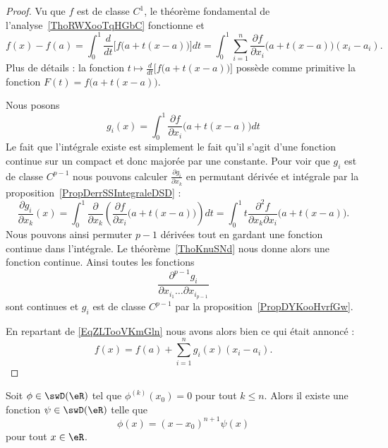 \begin{proof}
    Vu que \( f\) est de classe \( C^1\), le théorème fondamental de l'analyse~\ref{ThoRWXooTqHGbC} fonctionne et
    \begin{equation}    \label{EqZLTooVKmGln}
        f(x)-f(a)=\int_0^1\frac{ d }{ dt }\Big[ f\big( a+t(x-a) \big) \Big]dt=\int_0^1\sum_{i=1}^n\frac{ \partial f }{ \partial x_i }\big( a+t(x-a) \big)(x_i-a_i).
    \end{equation}
    Plus de détails : la fonction \( t\mapsto \frac{ d }{ dt }\Big[ f\big( a+t(x-a) \big) \Big]\) possède comme primitive la fonction \( F(t)=f\big( a+t(x-a) \big)\).

    Nous posons
    \begin{equation}
        g_i(x)=\int_0^1\frac{ \partial f }{ \partial x_i }\big( a+t(x-a) \big)dt
    \end{equation}
    Le fait que l'intégrale existe est simplement le fait qu'il s'agit d'une fonction continue sur un compact et donc majorée par une constante. Pour voir que \( g_i\) est de classe \( C^{p-1}\) nous pouvons calculer \( \frac{ \partial g_i }{ \partial x_k }\) en permutant dérivée et intégrale par la proposition~\ref{PropDerrSSIntegraleDSD} :
    \begin{equation}
        \frac{ \partial g_i }{ \partial x_k }(x)=\int_0^1\frac{ \partial  }{ \partial x_k }\left( \frac{ \partial f }{ \partial x_i }\big( a+t(x-a) \big) \right)dt=\int_0^1 t\frac{ \partial^2f }{ \partial x_k\partial x_i }\big( a+t(x-a) \big).
    \end{equation}
    Nous pouvons ainsi permuter \( p-1\) dérivées tout en gardant une fonction continue dans l'intégrale. Le théorème~\ref{ThoKnuSNd} nous donne alors une fonction continue. Ainsi toutes les fonctions
    \begin{equation}
        \frac{ \partial^{p-1}g_i }{ \partial x_{i_1}\ldots\partial x_{i_{p-1}} }
    \end{equation}
    sont continues et \( g_i\) est de classe \( C^{p-1}\) par la proposition~\ref{PropDYKooHvrfGw}.

    En repartant de \eqref{EqZLTooVKmGln} nous avons alors bien ce qui était annoncé :
    \begin{equation}
        f(x)=f(a)+\sum_{i=1}^ng_i(x)(x_i-a_i).
    \end{equation}
\end{proof}

\begin{corollary}       \label{CorQBXHooZVKeNG}
    Soit \( \phi\in\swD(\eR)\) tel que \( \phi^{(k)}(x_0)=0\) pour tout \( k\leq n\). Alors il existe une fonction \( \psi\in\swD(\eR)\) telle que
    \begin{equation}
        \phi(x)=(x-x_0)^{n+1}\psi(x)
    \end{equation}
    pour tout \( x\in \eR\).
\end{corollary}

